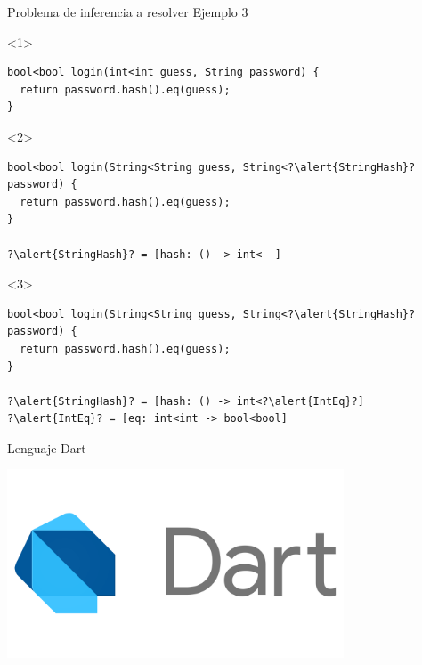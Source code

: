 \documentclass[aspectratio=169,10pt]{beamer}
\begin{document}
\begin{frame}[fragile]{Problema de inferencia a resolver}
	Ejemplo 3 \\
	\vspace{1cm}
	\begin{onlyenv}
\begin{lstlisting}[escapechar=?,basicstyle=\fontsize{9}{9}\ttfamily]
bool<bool login(int<int guess, String password) {
  return password.hash().eq(guess);
}
\end{lstlisting}
	\end{onlyenv}
	\begin{onlyenv}
\begin{lstlisting}[escapechar=?,basicstyle=\fontsize{9}{9}\ttfamily]
bool<bool login(String<String guess, String<?\alert{StringHash}? password) {
  return password.hash().eq(guess);
}

?\alert{StringHash}? = [hash: () -> int< -]
\end{lstlisting}
	\end{onlyenv}
	\begin{onlyenv}
\begin{lstlisting}[escapechar=?,basicstyle=\fontsize{9}{9}\ttfamily]
bool<bool login(String<String guess, String<?\alert{StringHash}? password) {
  return password.hash().eq(guess);
}

?\alert{StringHash}? = [hash: () -> int<?\alert{IntEq}?]
?\alert{IntEq}? = [eq: int<int -> bool<bool]
\end{lstlisting}
	\end{onlyenv}
\end{frame}

\begin{frame}[fragile]{Lenguaje Dart}
	\begin{center}
		\includegraphics[width=0.75\textwidth]{images/dart.png}
	\end{center}
\end{frame}
\end{document}
